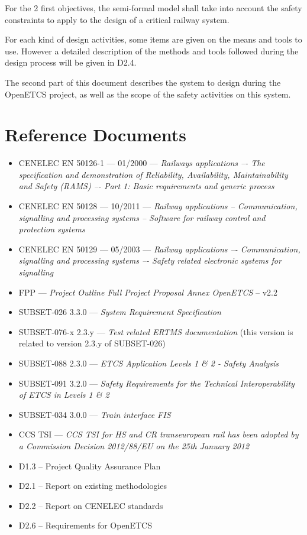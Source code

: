 For the 2 first objectives, the semi-formal  model  shall take into account the safety constraints to apply to the design of a critical railway system.

For each kind of design activities, some items are given on the means and tools to  use. However a detailed description of the methods and tools followed during the design process will be given in D2.4.

The second part of this document describes the system to design during the OpenETCS project, as well as the scope of the safety activities on this system.


\section{Reference Documents}
\begin{itemize}
\item CENELEC EN 50126-1 --- 01/2000 --- \emph{Railways applications –- The specification and
demonstration of Reliability, Availability, Maintainability and Safety (RAMS) –- Part 1:
Basic requirements and generic process}
\item CENELEC EN 50128 --- 10/2011 --- \emph{Railway applications -- Communication, signalling and
processing systems -- Software for railway control and protection systems}
\item CENELEC EN 50129 --- 05/2003 --- \emph{Railway applications –- Communication, signalling and
processing systems –- Safety related electronic systems for signalling}
\item FPP --- \emph{Project Outline Full Project Proposal Annex OpenETCS} -- v2.2
\item SUBSET-026 3.3.0 --- \emph{System Requirement Specification}
\item SUBSET-076-x 2.3.y --- \emph{Test related ERTMS documentation} (this version is related to version 2.3.y  of SUBSET-026)
\item SUBSET-088 2.3.0 --- \emph{ETCS Application Levels 1 \& 2 - Safety Analysis}
\item SUBSET-091 3.2.0 --- \emph{Safety Requirements for the Technical Interoperability
of ETCS in Levels 1 \& 2}
\item SUBSET-034 3.0.0 --- \emph{Train interface FIS}
\item CCS TSI --- \emph{ CCS TSI for HS and CR transeuropean rail has been adopted by a Commission Decision 2012/88/EU on the 25th January 2012}
\item D1.3 -- Project Quality Assurance Plan
\item D2.1 -- Report on existing methodologies 
\item D2.2 -- Report on CENELEC standards
\item D2.6 -- Requirements for OpenETCS
\end{itemize}

